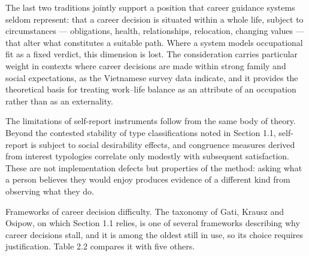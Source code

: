 The last two traditions jointly support a position that career guidance systems seldom represent: that a career decision is situated within a whole life, subject to circumstances --- obligations, health, relationships, relocation, changing values --- that alter what constitutes a suitable path. Where a system models occupational fit as a fixed verdict, this dimension is lost. The consideration carries particular weight in contexts where career decisions are made within strong family and social expectations, as the Vietnamese survey data indicate\cite{r4}, and it provides the theoretical basis for treating work--life balance as an attribute of an occupation rather than as an externality.

The limitations of self-report instruments follow from the same body of theory. Beyond the contested stability of type classifications noted in Section 1.1\cite{r6}, self-report is subject to social desirability effects, and congruence measures derived from interest typologies correlate only modestly with subsequent satisfaction. These are not implementation defects but properties of the method: asking what a person believes they would enjoy produces evidence of a different kind from observing what they do.

Frameworks of career decision difficulty. The taxonomy of Gati, Krausz and Osipow\cite{r1}, on which Section 1.1 relies, is one of several frameworks describing why career decisions stall, and it is among the oldest still in use, so its choice requires justification. Table 2.2 compares it with five others.

